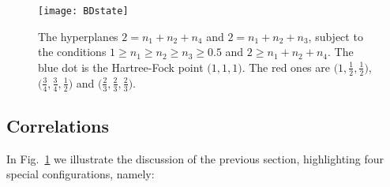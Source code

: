 \documentclass[aps,twocolumn,showpacs,pra,superscriptaddress,floatfix,longbibliography]{revtex4-1}
\newcommand{\7}{\dagger}
\begin{document}
\begin{figure}[!t] 
 \centering
\texttt{[image: BDstate]}
\caption{The hyperplanes $2 = n_1 + n_2 + n_4$ 
and $2 = n_1 + n_2 + n_3$, subject to the conditions 
$1 \ge n_1 \ge n_2 \ge n_3 \geq 0.5$ and 
$2 \geq n_1 + n_2 + n_4$. 
 The blue dot is the Hartree-Fock point $\bigl(1,1,1\bigr)$. 
 The red ones are $\bigl(1,\tfrac12,\tfrac12\bigr)$, 
 $\bigl(\tfrac34,\tfrac34,\tfrac12\bigr)$ and 
 $\bigl(\tfrac23,\tfrac23,\tfrac23\bigr)$.}
 \label{graf:polytope}
 \end{figure}


\subsection{Correlations}

In Fig.~\ref{graf:polytope} we illustrate the discussion of the 
previous section, highlighting four special 
configurations, namely:
\end{document}
